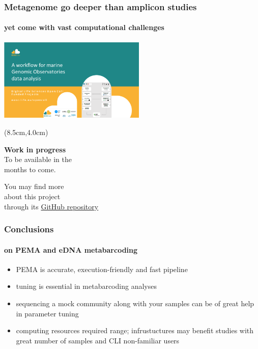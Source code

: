 \documentclass{beamer}
\begin{document}
   \begin{frame}
      \frametitle{Metagenome go deeper than amplicon studies}
      \framesubtitle{yet come with vast computational challenges}
      \includegraphics[width=70mm]{resources/marine-genomic-observatories.png}

      \begin{textblock*}{5cm}(8.5cm,4.0cm) %
            
         \textbf{Work in progress} \\
         To be available in the \\ months to come.

         \bigskip
         
         \footnotesize
         You may find more \\ 
         \footnotesize
         about this project  \\
         \footnotesize
         through its \href{https://github.com/emo-bon/pipeline-v5}{GitHub repository}

      \end{textblock*}
   \end{frame}
   \fi

   \begin{frame}
      \frametitle{Conclusions}
      \framesubtitle{on PEMA and eDNA metabarcoding}

      \begin{itemize}
         \item PEMA is accurate, execution-friendly and fast pipeline 
         \item tuning is essential in metabarcoding analyses
         \item sequencing a mock community along with your samples can be of great help in parameter tuning 
         \item computing resources required range; infrustuctures may benefit studies with great number of samples and CLI non-familiar users
      \end{itemize}
   \end{frame}
\end{document}
